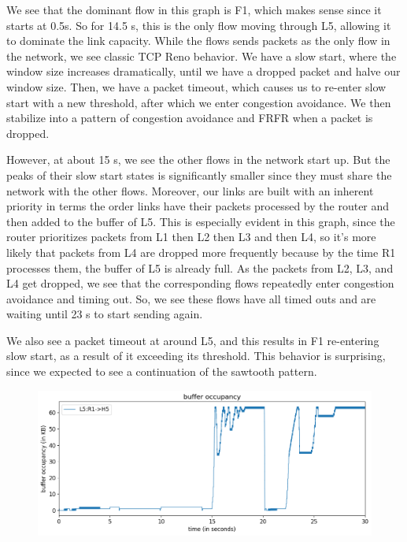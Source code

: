 \documentclass{article}
\begin{document}
We see that the dominant flow in this graph is F1, which makes sense since it starts at 0.5s. So for 14.5 s, this is the only flow moving through L5, allowing it to dominate the link capacity. While the flows sends packets as the only flow in the network, we see classic TCP Reno behavior. We have a slow start, where the window size increases dramatically, until we have a dropped packet and halve our window size. Then, we have a packet timeout, which causes us to re-enter slow start with a new threshold, after which we enter congestion avoidance. We then stabilize into a pattern of congestion avoidance and FRFR when a packet is dropped.

However, at about 15 s, we see the other flows in the network start up. But the peaks of their slow start states is significantly smaller since they must share the network with the other flows. Moreover, our links are built with an inherent priority in terms the order links have their packets processed by the router and then added to the buffer of L5. This is especially evident in this graph, since the router prioritizes packets from L1 then L2 then L3 and then L4, so it's more likely that packets from L4 are dropped more frequently because by the time R1 processes them, the buffer of L5 is already full. As the packets from L2, L3, and L4 get dropped, we see that the corresponding flows repeatedly enter congestion avoidance and timing out. So, we see these flows have all timed outs and are waiting until 23 s to start sending again.

We also see a packet timeout at around L5, and this results in F1 re-entering slow start, as a result of it exceeding its threshold. This behavior is surprising, since we expected to see a continuation of the sawtooth pattern. 

\begin{figure}[H]
\centering
\includegraphics[width = \textwidth]{test_case5_reno buffer occupancy.png}
\end{figure}
\end{document}
